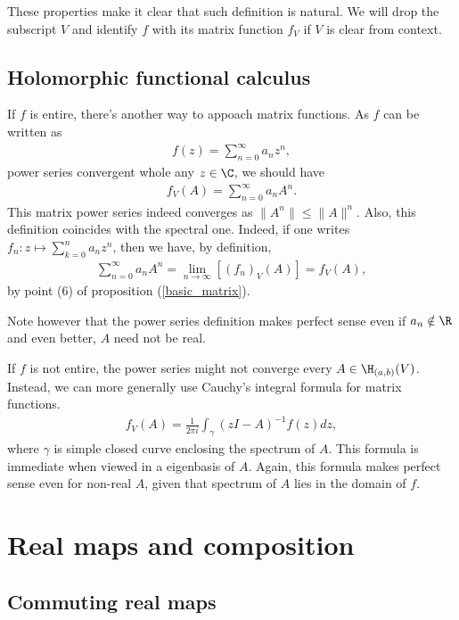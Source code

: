 These properties make it clear that such definition is natural. We will drop the subscript $V$ and identify $f$ with its matrix function $f_{V}$ if $V$ is clear from context.

\subsection{Holomorphic functional calculus}

If $f$ is entire, there's another way to appoach matrix functions. As $f$ can be written as
\begin{align*}
	f(z) = \sum_{n = 0}^{\infty} a_{n} z^{n},
\end{align*}
power series convergent whole any $z \in \C$, we should have
\begin{align*}
	f_{V}(A) = \sum_{n = 0}^{\infty} a_{n} A^{n}.
\end{align*}
This matrix power series indeed converges as $\|A^{n}\| \leq \|A\|^{n}$. Also, this definition coincides with the spectral one. Indeed, if one writes $f_{n} : z \mapsto  \sum_{k = 0}^{n} a_{n} z^{n}$, then we have, by definition,
\begin{align*}
	\sum_{n = 0}^{\infty}a_{n} A^{n} = \lim_{n \to \infty} \left[(f_{n})_{V}(A) \right] = f_{V}(A),
\end{align*}
by point (6) of proposition (\ref{basic_matrix}).

Note however that the power series definition makes perfect sense even if $a_{n} \notin \R$ and even better, $A$ need not be real.

If $f$ is not entire, the power series might not converge every $A \in \H_{(a, b)}(V)$. Instead, we can more generally use Cauchy's integral formula for matrix functions.
\begin{align*}
	f_{V}(A) = \frac{1}{2 \pi i}\int_{\gamma} (z I - A)^{-1} f(z) dz,
\end{align*}
where $\gamma$ is simple closed curve enclosing the spectrum of $A$. This formula is immediate when viewed in a eigenbasis of $A$. Again, this formula makes perfect sense even for non-real $A$, given that spectrum of $A$ lies in the domain of $f$.

\section{Real maps and composition}

\subsection{Commuting real maps}

